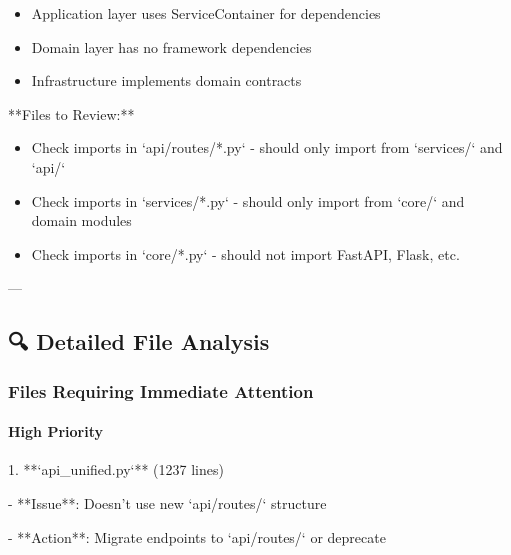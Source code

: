 \documentclass[11pt,a4paper]{article}
\begin{document}
\begin{itemize}
\item [ ] Application layer uses ServiceContainer for dependencies
\end{itemize}

\begin{itemize}
\item [ ] Domain layer has no framework dependencies
\end{itemize}

\begin{itemize}
\item [ ] Infrastructure implements domain contracts
\end{itemize}

**Files to Review:**

\begin{itemize}
\item Check imports in `api/routes/*.py` - should only import from `services/` and `api/`
\end{itemize}

\begin{itemize}
\item Check imports in `services/*.py` - should only import from `core/` and domain modules
\end{itemize}

\begin{itemize}
\item Check imports in `core/*.py` - should not import FastAPI, Flask, etc.
\end{itemize}

---

\subsection{🔍 Detailed File Analysis}

\subsubsection{Files Requiring Immediate Attention}

\paragraph{High Priority}

1. **`api\_unified.py`** (1237 lines)

   - **Issue**: Doesn't use new `api/routes/` structure

   - **Action**: Migrate endpoints to `api/routes/` or deprecate
\end{document}
